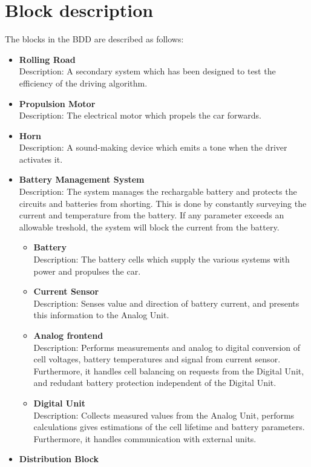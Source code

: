 \section{Block description}
The blocks in the BDD are described as follows:
\begin{itemize}
	\item \textbf{Rolling Road}\\
	Description: A secondary system which has been designed to test the efficiency of the driving algorithm.
	\item \textbf{Propulsion Motor}\\
	Description: The electrical motor which propels the car forwards.
	\item \textbf{Horn}\\
	Description: A sound-making device which emits a tone when the driver activates it.
	\item \textbf{Battery Management System}\\
	Description: The system manages the rechargable battery and protects the circuits and batteries from shorting. This is done by constantly surveying the current and temperature from the battery. If any parameter exceeds an allowable treshold, the system will block the current from the battery.
	\begin{itemize}
		\item \textbf{Battery}\\
		Description: The battery cells which supply the various systems with power and propulses the car.
		\item \textbf{Current Sensor}\\
		Description: Senses value and direction of battery current, and presents this information to the Analog Unit.
		\item \textbf{Analog frontend}\\
		Description: Performs measurements and analog to digital conversion of cell voltages, battery temperatures and signal from current sensor. Furthermore, it handles cell balancing on requests from the Digital Unit, and redudant battery protection independent of the Digital Unit.
		\item \textbf{Digital Unit}\\
		Description: Collects measured values from the Analog Unit, performs calculations gives estimations of the cell lifetime and battery parameters. Furthermore, it handles communication with external units.
	\end{itemize}
	\item \textbf{Distribution Block}\\ 

\end{itemize}
